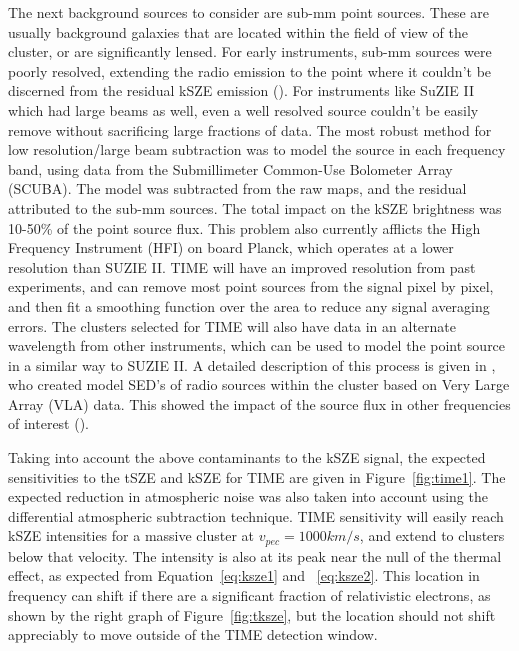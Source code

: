 \documentclass[manuscript]{aastex}
\begin{document}
The next background sources to consider are sub-mm point sources. These are usually background galaxies that are located within the field of view of the cluster, or are significantly lensed. For early instruments, sub-mm sources were poorly resolved, extending the radio emission to the point where it couldn't be discerned from the residual kSZE emission (\cite{Benson2003}). For instruments like SuZIE II which had large beams as well, even a well resolved source couldn't be easily remove without sacrificing large fractions of data. The most robust method for low resolution/large beam subtraction was to model the source in each frequency band, using data from the Submillimeter Common-Use Bolometer Array (SCUBA). The model was subtracted from the raw maps, and the residual attributed to the sub-mm sources. The total impact on the kSZE brightness was 10-50\% of the point source flux. This problem also currently afflicts the High Frequency Instrument (HFI) on board Planck, which operates at a lower resolution than SUZIE II. TIME will have an improved resolution from past experiments, and can remove most point sources from the signal pixel by pixel, and then fit a smoothing function over the area to reduce any signal averaging errors. The clusters selected for TIME will also have data in an alternate wavelength from other instruments, which can be used to model the point source in a similar way to SUZIE II. A detailed description of this process is given in \cite{Adam2016}, who created model SED's of radio sources within the cluster based on Very Large Array (VLA) data. This showed the impact of the source flux in other frequencies of interest (\cite{Adam2017}). 


Taking into account the above contaminants to the kSZE signal, the expected sensitivities to the tSZE and kSZE for TIME are given in Figure~\ref{fig:time1}. The expected reduction in atmospheric noise was also taken into account using the differential atmospheric subtraction technique. TIME sensitivity will easily reach kSZE intensities for a massive cluster at $v_{pec} = 1000 km/s$, and extend to clusters below that velocity. The intensity is also at its peak near the null of the thermal effect, as expected from Equation~\ref{eq:ksze1} and ~\ref{eq:ksze2}. This location in frequency can shift if there are a significant fraction of relativistic electrons, as shown by the right graph of Figure~\ref{fig:tksze}, but the location should not shift appreciably to move outside of the TIME detection window.
\end{document}
